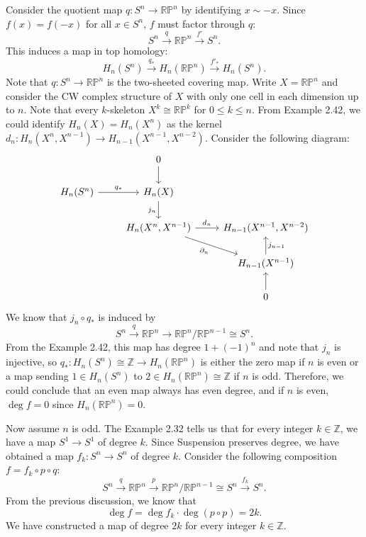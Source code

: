 \documentclass[a4paper, 12pt]{article}
\begin{document}
\begin{solution}
Consider the quotient map \(q:S^n\rightarrow \mathbb{R}\mathbb{P}^n\) by identifying \(x\sim -x\). Since \(f(x)=f(-x)\) for all \(x\in S^n\), \(f\) must factor through \(q\):
\[S^n\xrightarrow{q} \mathbb{R}\mathbb{P}^n\xrightarrow{f'}S^n.\]
This induces a map in top homology:
\[H_n(S^n)\xrightarrow{q_*} H_n(\mathbb{R}\mathbb{P}^n)\xrightarrow{f'_*}H_n(S^n).\]
Note that \(q:S^n\rightarrow \mathbb{R}\mathbb{P}^n\) is the two-sheeted covering map. Write \(X=\mathbb{R}\mathbb{P}^n\) and consider the CW complex structure of \(X\) with only one cell in each dimension up to \(n\). Note that 
every \(k\)-skeleton \(X^k\cong \mathbb{R}\mathbb{P}^k\) for \(0\leq k \leq n\). From Example 2.42, we could identify \(H_n(X)=H_n(X^n)\) as the kernel \(d_n:H_n(X^n,X^{n-1})\rightarrow H_{n-1}(X^{n-1},X^{n-2})\). Consider the following diagram:
\[\begin{tikzcd}
	& 0 \\
	{H_n(S^n)} & {H_n(X)} \\
	& {H_n(X^n,X^{n-1})} & {H_{n-1}(X^{n-1},X^{n-2})} \\
	&& {H_{n-1}(X^{n-1})} \\
	&& 0
	\arrow[from=1-2, to=2-2]
	\arrow["{q_*}", from=2-1, to=2-2]
	\arrow["{j_n}"', from=2-2, to=3-2]
	\arrow["{d_n}", from=3-2, to=3-3]
	\arrow["{\partial_n}"', from=3-2, to=4-3]
	\arrow["{j_{n-1}}"', from=4-3, to=3-3]
	\arrow[from=5-3, to=4-3]
\end{tikzcd}\]
We know that \(j_n\circ q_*\) is induced by 
\[S^n\xrightarrow{q}\mathbb{R}\mathbb{P}^n\rightarrow \mathbb{R}\mathbb{P}^n/\mathbb{R}\mathbb{P}^{n-1}\cong S^n.\]
From the Example 2.42, this map has degree \(1+(-1)^n\) and note that \(j_n\) is injective, so \(q_*:H_n(S^n)\cong \mathbb{Z}\rightarrow H_n(\mathbb{R}\mathbb{P}^n)\) is either the zero map if \(n\) is even or 
a map sending \(1\in H_n(S^n)\) to \(2\in H_n(\mathbb{R}\mathbb{P}^n)\cong \mathbb{Z}\) if \(n\) is odd. Therefore, we could conclude that an even map always has even degree, and if \(n\) is even, \(\deg f=0\) since \(H_n(\mathbb{R}\mathbb{P}^n)=0\).

Now assume \(n\) is odd. The Example 2.32 tells us that for every integer \(k\in \mathbb{Z}\), we have a map \(S^1\rightarrow S^1\) of degree \(k\). Since Suspension preserves degree, we have obtained a map \(f_k:S^n\rightarrow S^n\) of degree \(k\). Consider the following 
composition \(f=f_k\circ p\circ q\):
\[S^n\xrightarrow{q}\mathbb{R}\mathbb{P}^n\xrightarrow{p} \mathbb{R}\mathbb{P}^n/\mathbb{R}\mathbb{P}^{n-1}\cong S^n\xrightarrow{f_k}S^n.\]
From the previous discussion, we know that 
\[\deg f=\deg f_k \cdot \deg (p\circ p)=2k.\]
We have constructed a map of degree \(2k\) for every integer \(k\in \mathbb{Z}\).
\end{solution}
\end{document}
